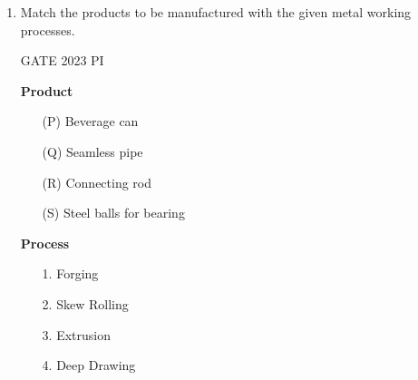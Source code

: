 \documentclass[journal,12pt,onecolumn]{IEEEtran}
\theoremstyle{remark}
\begin{document}
\begin{enumerate}
\hfill{GATE 2023 PI}

\begin{multicols}{2}
\textbf{Recording technique}
\begin{enumerate}
    \item[(P)] Outline process chart
    \item[(Q)] String diagram
    \item[(R)] Multiple activity chart
    \item[(S)] Two-handed process chart
\end{enumerate}
\columnbreak
\textbf{Application area}
\begin{enumerate}
    \item[1.] Factory layout - movement of workers
    \item[2.] Gang work
    \item[3.] Complete manufacturing sequence of a product
    \item[4.] Manual assembly of nuts and bolts
\end{enumerate}
\end{multicols}

\begin{multicols}{2}
\begin{enumerate}
    \item P -- 3, Q -- 4, R -- 2, S -- 1
    \item P -- 3, Q -- 1, R -- 2, S -- 4
    \item P -- 2, Q -- 4, R -- 3, S -- 1
    \item P -- 2, Q -- 1, R -- 3, S -- 4
\end{enumerate}
\end{multicols}
\item Match the products to be manufactured with the given metal working processes.

\hfill{GATE 2023 PI}

\begin{multicols}{2}
\textbf{Product}
\begin{enumerate}
    \item[(P)] Beverage can
    \item[(Q)] Seamless pipe
    \item[(R)] Connecting rod
    \item[(S)] Steel balls for bearing
\end{enumerate}
\columnbreak
\textbf{Process}
\begin{enumerate}
    \item[1.] Forging
    \item[2.] Skew Rolling
    \item[3.] Extrusion
    \item[4.] Deep Drawing
\end{enumerate}
\end{multicols}


\end{enumerate}
\end{document}
